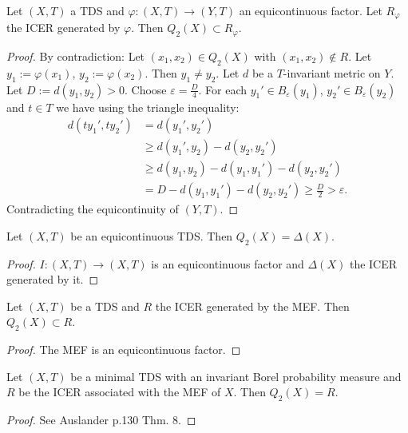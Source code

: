 \begin{theorem}
  Let $(X,T)$ a TDS and $\varphi : (X,T) \to (Y,T)$ an equicontinuous factor.
  Let $R_\varphi$ the ICER generated by $\varphi$. Then $Q_2(X) \subset R_\varphi$.
\end{theorem}
\begin{proof}
  By contradiction: Let $(x_1,x_2) \in Q_2(X)$ with $(x_1,x_2) \notin R$.
  Let $y_1 := \varphi (x_1)$, $y_2 := \varphi (x_2)$.
  Then $y_1 \neq y_2$.
  Let $d$ be a $T$-invariant metric on $Y$. Let $D := d(y_1, y_2) > 0$.
  Choose $\varepsilon = \frac{D}{4}$.
  For each $y_1' \in B_\varepsilon(y_1)$, $y_2' \in B_\varepsilon(y_2)$ and $t \in T$ we have using the triangle inequality:
  \begin{equation*}
    \begin{split}
      d(ty_1', ty_2') &= d(y_1', y_2') \\
      &\geq  d(y_1', y_2) - d(y_2, y_2')  \\
      &\geq d (y_1, y_2) - d(y_1, y_1')  - d(y_2, y_2')  \\
      &= D - d(y_1, y_1') - d(y_2, y_2') \geq \frac{D}{2} > \varepsilon.
    \end{split}
  \end{equation*}
  Contradicting the equicontinuity of $(Y,T)$.
\end{proof}
\begin{corollary}
 Let $(X, T)$ be an equicontinuous TDS.
  Then $Q_2(X) = \Delta(X)$.
\end{corollary}
\begin{proof}
  $I : (X,T) \to (X,T)$ is an equicontinuous factor and $\Delta (X)$ the ICER generated by it.
  \end{proof}
\begin{corollary}
 Let $(X, T)$ be a TDS and $R$ the ICER generated by the MEF.
  Then $Q_2(X) \subset R$.
\end{corollary}
\begin{proof}
  The MEF is an equicontinuous factor.
  \end{proof}

\begin{theorem}
  Let $(X, T)$ be a minimal TDS with an invariant Borel probability measure
  and $R$ be the ICER associated with the MEF of $X$.
  Then $Q_2(X) = R$.
\end{theorem}

\begin{proof}
  See Auslander p.130 Thm. 8.
\end{proof}

